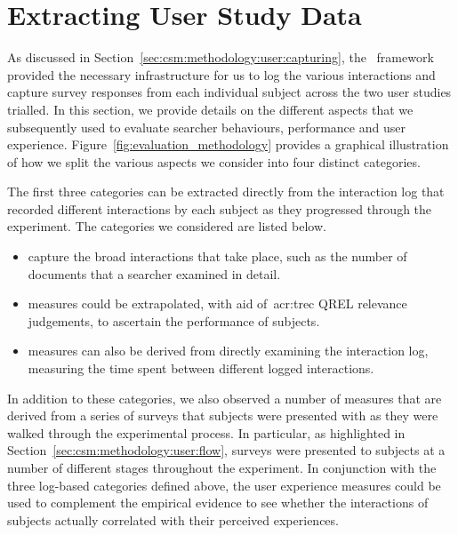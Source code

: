 \section{Extracting User Study Data}\label{sec:csm:methodology:extracting}
As discussed in Section~\ref{sec:csm:methodology:user:capturing}, the \treconomics~framework provided the necessary infrastructure for us to log the various interactions and capture survey responses from each individual subject across the two user studies trialled. In this section, we provide details on the different aspects that we subsequently used to evaluate searcher behaviours, performance and user experience. Figure~\ref{fig:evaluation_methodology} provides a graphical illustration of how we split the various aspects we consider into four distinct categories.

The first three categories can be extracted directly from the interaction log that recorded different interactions by each subject as they progressed through the experiment. The categories we considered are listed below.

\begin{itemize}
    
    \item[]{ capture the broad interactions that take place, such as the number of documents that a searcher examined in detail.}
    \item[]{ measures could be extrapolated, with aid of~\gls{acr:trec} QREL relevance judgements, to ascertain the performance of subjects.}
    \item[]{ measures can also be derived from directly examining the interaction log, measuring the time spent between different logged interactions.}
    
\end{itemize}

In addition to these categories, we also observed a number of  measures that are derived from a series of surveys that subjects were presented with as they were walked through the experimental process. In particular, as highlighted in Section~\ref{sec:csm:methodology:user:flow}, surveys were presented to subjects at a number of different stages throughout the experiment. In conjunction with the three log-based categories defined above, the user experience measures could be used to complement the empirical evidence to see whether the interactions of subjects actually correlated with their perceived experiences.

